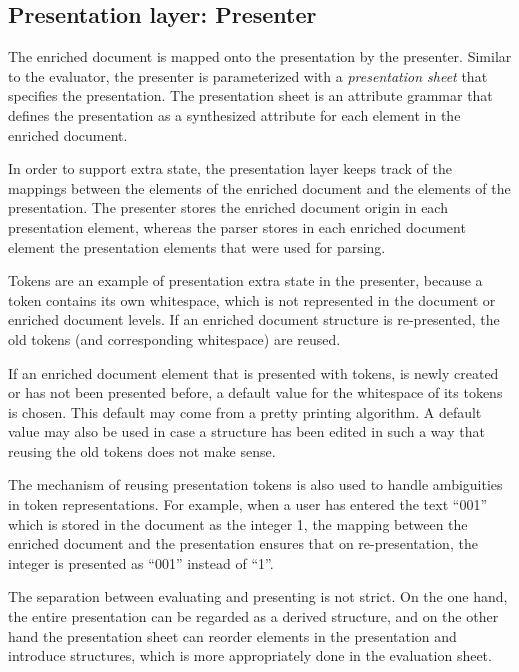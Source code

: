 %																
\subsection{Presentation layer: Presenter} \label{sect:presenter}

The enriched document is mapped onto the presentation by the presenter. Similar to the evaluator, the presenter is parameterized with a {\em presentation sheet} that specifies the presentation. The presentation sheet is an attribute grammar that defines the presentation as a synthesized attribute for each element in the enriched document. 

In order to support extra state, the presentation layer keeps track of the mappings between the elements of the enriched document and the elements of the presentation. The presenter stores the enriched document origin in each presentation element, whereas the parser stores in each enriched document element the presentation elements that were used for parsing.

Tokens are an example of presentation extra state in the presenter, because a token contains its own whitespace, which is not represented in the document or enriched document levels. If an enriched document structure is re-presented, the old tokens (and corresponding white\-space) are reused. 

If an enriched document element that is presented with tokens, is newly created or has not been presented before, a default value for the whitespace of its tokens is chosen. This default may come from a pretty printing algorithm. A default value may also be used in case a structure has been edited in such a way that reusing the old tokens does not make sense.

The mechanism of reusing presentation tokens is also used to handle ambiguities in token representations. For example, when a user has entered the text ``001'' which is stored in the document as the integer 1, the mapping between the enriched document and the presentation ensures that on re-presentation, the integer is presented as ``001'' instead of ``1''.

The separation between evaluating and presenting is not strict. On the one hand, the entire presentation can be regarded as a derived structure, and on the other hand the presentation sheet can reorder elements in the presentation and introduce structures, which is more appropriately done in the evaluation sheet. 

